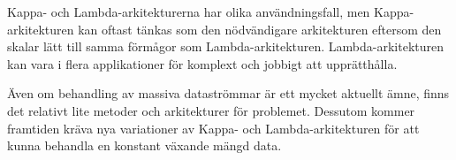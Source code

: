 Kappa- och Lambda-arkitekturerna har olika användningsfall, men Kappa-arkitekturen
kan oftast tänkas som den nödvändigare arkitekturen eftersom den skalar lätt till
samma förmågor som Lambda-arkitekturen. Lambda-arkitekturen kan vara i flera
applikationer för komplext och jobbigt att upprätthålla.

Även om behandling av massiva dataströmmar är ett mycket aktuellt ämne, finns det
relativt lite metoder och arkitekturer för problemet. Dessutom kommer framtiden
kräva nya variationer av Kappa- och Lambda-arkitekturen för att kunna behandla en
konstant växande mängd data.
